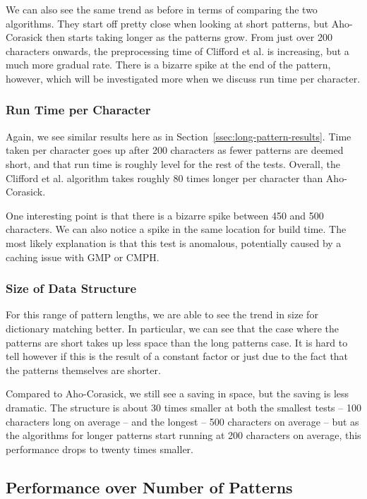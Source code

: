 \documentclass[ %
                    author={Dominic Joseph Moylett},
                    degree={MEng},
                     title={Dictionary Matching with Fingerprints},
                  subtitle={An Empirical Analysis},
                      type={research},
                      year={2015} ]{dissertation}
\begin{document}
We can also see the same trend as before in terms of comparing the two algorithms. They start off pretty close when looking at short patterns, but Aho-Corasick then starts taking longer as the patterns grow. From just over 200 characters onwards, the preprocessing time of Clifford et al. is increasing, but a much more gradual rate. There is a bizarre spike at the end of the pattern, however, which will be investigated more when we discuss run time per character.

\subsubsection{Run Time per Character}

Again, we see similar results here as in Section~\ref{ssec:long-pattern-results}. Time taken per character goes up after 200 characters as fewer patterns are deemed short, and that run time is roughly level for the rest of the tests. Overall, the Clifford et al. algorithm takes roughly 80 times longer per character than Aho-Corasick.

One interesting point is that there is a bizarre spike between 450 and 500 characters. We can also notice a spike in the same location for build time. The most likely explanation is that this test is anomalous, potentially caused by a caching issue with GMP or CMPH.

\subsubsection{Size of Data Structure}

For this range of pattern lengths, we are able to see the trend in size for dictionary matching better. In particular, we can see that the case where the patterns are short takes up less space than the long patterns case. It is hard to tell however if this is the result of a constant factor or just due to the fact that the patterns themselves are shorter.

Compared to Aho-Corasick, we still see a saving in space, but the saving is less dramatic. The structure is about 30 times smaller at both the smallest tests -- 100 characters long on average -- and the longest -- 500 characters on average -- but as the algorithms for longer patterns start running at 200 characters on average, this performance drops to twenty times smaller.

\subsection{Performance over Number of Patterns}
\label{ssec:many-pattern-results}
\end{document}
